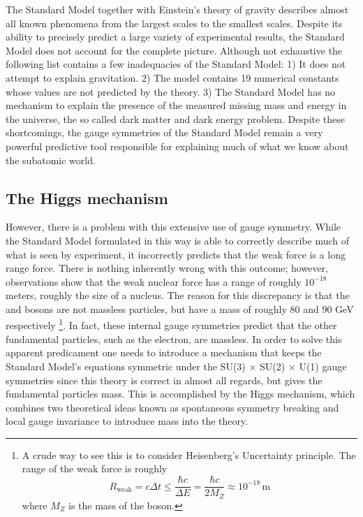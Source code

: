 The Standard Model together with Einstein's theory of gravity describes almost
all known phenomena from the largest scales to the smallest scales. Despite
its ability to precisely predict a large variety of experimental results, the
Standard Model does not account for the complete picture. Although not exhaustive
the following list contains a few inadequacies of the Standard Model:
1) It does not attempt to explain gravitation.
2) The model contains 19 numerical constants whose values are not predicted
by the theory.
3) The Standard Model has no mechanism to explain the presence of the measured
missing mass and energy in the universe, the so called dark matter and dark energy 
problem. Despite these shortcomings, the gauge symmetries of the Standard Model 
remain a very powerful predictive tool responsible for explaining much of
what we know about the subatomic world.

\subsection{The Higgs mechanism}
\label{subsec:higgsmec}
However, there is a problem with this extensive use of gauge symmetry.
While the Standard Model formulated in this way
is able to correctly describe much of what is seen by experiment, it
incorrectly predicts that the weak force is a long range force. There is
nothing inherently wrong with this outcome; however, observations show 
that the weak nuclear force has a range of roughly $10^{-18}$ meters, roughly
the size of a nucleus. The reason for this discrepancy is that the
\WBosons and \ZBoson bosons are
not massless particles, but have a mass of roughly 80 and 90 GeV respectively
\footnote{A crude way to see this is to consider Heisenberg's Uncertainty
principle. The range of the weak force is roughly
\[
    R_{\text{weak}} = c\Delta t \le \frac{\hbar c}{\Delta E} = \frac{\hbar c}{2 M_{Z}} \approx 10^{-18}\, \text{m}
\]
where $M_{Z}$ is the mass of the \ZBoson boson.
}.
In fact, these internal gauge symmetries predict that the other fundamental
particles, such as the electron, are massless.
In order to solve this apparent predicament one needs to introduce a mechanism
that keeps the Standard Model's equations symmetric under the SU(3) $\times$
SU(2) $\times$ U(1) gauge symmetries since this theory is correct in
almost all regards, but gives the fundamental particles mass.
This is accomplished by the Higgs mechanism, which combines two theoretical ideas
known as spontaneous symmetry breaking and local gauge invariance to introduce
mass into the theory.

